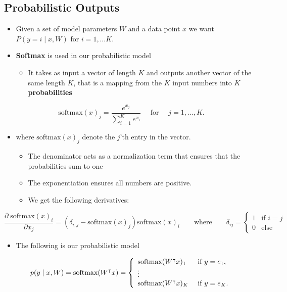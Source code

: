 \documentclass[11pt]{article}
\begin{document}
\subsection{Probabilistic Outputs}
\label{sec:org79c8d68}
\begin{itemize}
\item Given a set of model parameters \(W\) and a data point \(x\) we want \(P(y=i\mid x, W)\) for \(i=1,\dots K\).

\item \textbf{Softmax} is used in our probabilistic model
\begin{itemize}
\item It takes as input a vector of length \(K\) and outputs another vector of the same length \(K\), that is a mapping from the \(K\) input numbers into \(K\) \textbf{probabilities}
\end{itemize}
\end{itemize}
\begin{equation}
\textrm{softmax}(x)_j =
\frac{e^{x_j}}
{\sum_{i=1}^K e^{x_i}}\quad
\textrm{ for }\quad j = 1, \dots, K.
\end{equation}
\begin{itemize}
\item where \(\textrm{softmax}(x)_j\) denote the \(j\)'th entry in the vector.
\begin{itemize}
\item The denominator acts as a normalization term that ensures that the probabilities sum to one
\item The exponentiation ensures all numbers are positive.
\item We get the following derivatives:
\end{itemize}
\end{itemize}
\begin{equation}
\frac
{\partial \;\textrm{softmax}(x)_i}
{\partial x_j} =
(\delta_{i,j} - \textrm{softmax}(x)_j)
\textrm{softmax}(x)_i\quad\quad\text{where}\quad\quad
\delta_{ij}=\begin{cases}1 &\text{if }i=j\\
0 & \text{else}
\end{cases}
\end{equation}

\begin{itemize}
\item The following is our probabilistic model
\end{itemize}
\begin{equation}
p(y \mid x, W) =
\textrm{softmax}(W^\intercal x) =
 \left \{
\begin{array}{l l}
 \textrm{softmax}(W^\intercal x)_1 & \text{ if } y = e_1,  \\
 \vdots & \\
 \textrm{softmax}(W^\intercal x)_K & \text { if } y = e_K.
\end{array}
\right.
\end{equation}
\end{document}
